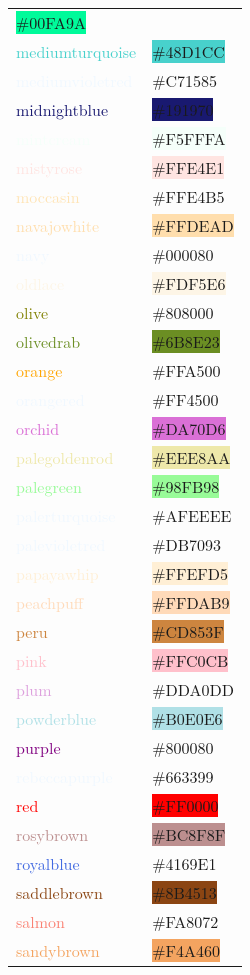 \documentclass[
]{article}
\begin{document}
\begin{longtable}[]{@{}ll@{}}
\colorbox{mediumspringgreen}{\#00FA9A}\tabularnewline
\textcolor{mediumturquoise}{mediumturquoise} &
\colorbox{mediumturquoise}{\#48D1CC}\tabularnewline
\textcolor{aliceblue}{mediumvioletred} &
\colorbox{mediumviolet-red}{\#C71585}\tabularnewline
\textcolor{midnightblue}{midnightblue} &
\colorbox{midnightblue}{\#191970}\tabularnewline
\textcolor{mintcream}{mintcream} &
\colorbox{mintcream}{\#F5FFFA}\tabularnewline
\textcolor{mistyrose}{mistyrose} &
\colorbox{mistyrose}{\#FFE4E1}\tabularnewline
\textcolor{moccasin}{moccasin} &
\colorbox{peach}{\#FFE4B5}\tabularnewline
\textcolor{navajowhite}{navajowhite} &
\colorbox{navajowhite}{\#FFDEAD}\tabularnewline
\textcolor{aliceblue}{navy} &
\colorbox{navyblue}{\#000080}\tabularnewline
\textcolor{oldlace}{oldlace} &
\colorbox{oldlace}{\#FDF5E6}\tabularnewline
\textcolor{olive}{olive} & \colorbox{heartgold}{\#808000}\tabularnewline
\textcolor{olivedrab}{olivedrab} &
\colorbox{olivedrab}{\#6B8E23}\tabularnewline
\textcolor{orange}{orange} &
\colorbox{chromeyellow}{\#FFA500}\tabularnewline
\textcolor{aliceblue}{orangered} &
\colorbox{orange-red}{\#FF4500}\tabularnewline
\textcolor{orchid}{orchid} & \colorbox{orchid}{\#DA70D6}\tabularnewline
\textcolor{palegoldenrod}{palegoldenrod} &
\colorbox{palegoldenrod}{\#EEE8AA}\tabularnewline
\textcolor{palegreen}{palegreen} &
\colorbox{palegreen}{\#98FB98}\tabularnewline
\textcolor{aliceblue}{palerturquoise} &
\colorbox{paleblue}{\#AFEEEE}\tabularnewline
\textcolor{aliceblue}{palevioletred} &
\colorbox{palered-violet}{\#DB7093}\tabularnewline
\textcolor{papayawhip}{papayawhip} &
\colorbox{papayawhip}{\#FFEFD5}\tabularnewline
\textcolor{peachpuff}{peachpuff} &
\colorbox{peachpuff}{\#FFDAB9}\tabularnewline
\textcolor{peru}{peru} & \colorbox{peru}{\#CD853F}\tabularnewline
\textcolor{pink}{pink} & \colorbox{pink}{\#FFC0CB}\tabularnewline
\textcolor{plum}{plum} &
\colorbox{mediumlavendermagenta}{\#DDA0DD}\tabularnewline
\textcolor{powderblue}{powderblue} &
\colorbox{powderblue}{\#B0E0E6}\tabularnewline
\textcolor{purple}{purple} &
\colorbox{patriarch}{\#800080}\tabularnewline
\textcolor{aliceblue}{rebeccapurple} &
\colorbox{purpleheart}{\#663399}\tabularnewline
\textcolor{red}{red} & \colorbox{red}{\#FF0000}\tabularnewline
\textcolor{rosybrown}{rosybrown} &
\colorbox{rosybrown}{\#BC8F8F}\tabularnewline
\textcolor{royalblue}{royalblue} &
\colorbox{hanblue}{\#4169E1}\tabularnewline
\textcolor{saddlebrown}{saddlebrown} &
\colorbox{saddlebrown}{\#8B4513}\tabularnewline
\textcolor{salmon}{salmon} &
\colorbox{coralpink}{\#FA8072}\tabularnewline
\textcolor{sandybrown}{sandybrown} &
\colorbox{sandybrown}{\#F4A460}\tabularnewline

\end{longtable}
\end{document}

